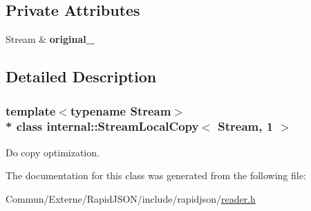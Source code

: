 \subsection*{Private Attributes}
\begin{DoxyCompactItemize}
\item 
Stream \& {\bfseries original\+\_\+}\hypertarget{classinternal_1_1_stream_local_copy_3_01_stream_00_011_01_4_a95cf773c6d96bb2c862cec8d1b54d658}{}\label{classinternal_1_1_stream_local_copy_3_01_stream_00_011_01_4_a95cf773c6d96bb2c862cec8d1b54d658}

\end{DoxyCompactItemize}


\subsection{Detailed Description}
\subsubsection*{template$<$typename Stream$>$\\*
class internal\+::\+Stream\+Local\+Copy$<$ Stream, 1 $>$}

Do copy optimization. 

The documentation for this class was generated from the following file\+:\begin{DoxyCompactItemize}
\item 
Commun/\+Externe/\+Rapid\+J\+S\+O\+N/include/rapidjson/\hyperlink{reader_8h}{reader.\+h}\end{DoxyCompactItemize}
